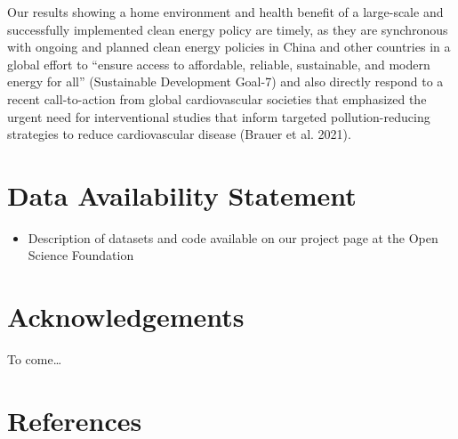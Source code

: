 \documentclass[
  letterpaper,
  DIV=11,
  numbers=noendperiod]{scrartcl}
\providecommand{\tightlist}{%
  \setlength{\itemsep}{0pt}\setlength{\parskip}{0pt}}\usepackage{longtable,booktabs,array}
\begin{document}
Our results showing a home environment and health benefit of a
large-scale and successfully implemented clean energy policy are timely,
as they are synchronous with ongoing and planned clean energy policies
in China and other countries in a global effort to ``ensure access to
affordable, reliable, sustainable, and modern energy for all''
(Sustainable Development Goal-7) and also directly respond to a recent
call-to-action from global cardiovascular societies that emphasized the
urgent need for interventional studies that inform targeted
pollution-reducing strategies to reduce cardiovascular disease (Brauer
et al. 2021).

\hypertarget{data-availability-statement}{%
\section{Data Availability
Statement}\label{data-availability-statement}}

\begin{itemize}
\tightlist
\item
  Description of datasets and code available on our project page at the
  Open Science Foundation
\end{itemize}

\hypertarget{acknowledgements}{%
\section{Acknowledgements}\label{acknowledgements}}

To come\ldots{}

\hypertarget{references}{%
\section{References}\label{references}}
\end{document}
